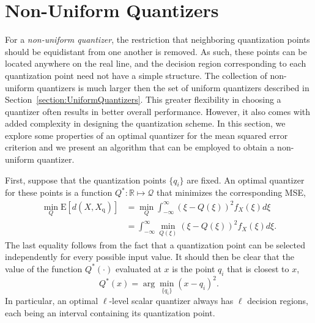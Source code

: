 \section{Non-Uniform Quantizers}
\label{section:NonUniformQuantizers}

For a \emph{non-uniform quantizer}, the restriction that neighboring quantization points should be equidistant from one another is removed.
As such, these points can be located anywhere on the real line, and the decision region corresponding to each quantization point need not have a simple structure.
The collection of non-uniform quantizers is much larger then the set of uniform quantizers described in Section~\ref{section:UniformQuantizers}.
This greater flexibility in choosing a quantizer often results in better overall performance.
However, it also comes with added complexity in designing the quantization scheme.
In this section, we explore some properties of an optimal quantizer for the mean squared error criterion and we present an algorithm that can be employed to obtain a non-uniform quantizer.

First, suppose that the quantization points $\{ q_i \}$ are fixed.
An optimal quantizer for these points is a function $Q^* : \mathbb{R} \mapsto \mathcal{Q}$ that minimizes the corresponding MSE,
\begin{equation*}
\begin{split}
\min_Q \mathrm{E} [ d(X, X_{\mathrm{q}}) ]
&= \min_Q \int_{-\infty}^{\infty} (\xi - Q(\xi))^2 f_X(\xi) d\xi \\
&= \int_{-\infty}^{\infty} \min_{Q(\xi)} (\xi - Q(\xi))^2 f_X(\xi) d\xi .
\end{split}
\end{equation*}
The last equality follows from the fact that a quantization point can be selected independently for every possible input value.
It should then be clear that the value of the function $Q^*(\cdot)$ evaluated at $x$ is the point $q_i$ that is closest to $x$,
\begin{equation*}
Q^*(x) = \arg \min_{\{ q_i \}} (x - q_i)^2 .
\end{equation*}
In particular, an optimal $\ell$-level scalar quantizer always has $\ell$ decision regions, each being an interval containing its quantization point.

